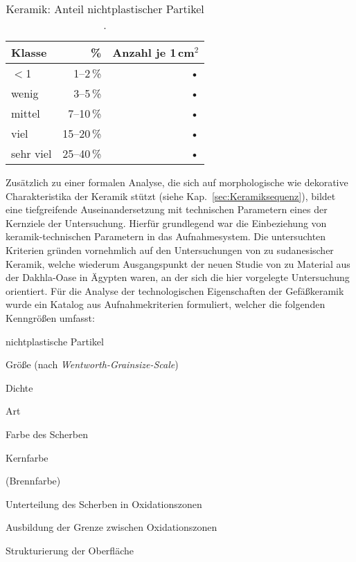\begin{table*}[!tb]
	\begin{center}
		{\small
			\begin{tabular}{@{}lrr@{}}
				\toprule
				\textbf{Klasse} & \textbf{\%} & \textbf{Anzahl je 1\,cm$^2$} \\
				\midrule
				$<$1 & 1--2\,\% & • \\
				wenig & 3--5\,\% & • \\
				mittel & 7--10\,\% & • \\
				viel & 15--20\,\% & • \\
				sehr viel & 25--40\,\% & • \\
				\bottomrule
		\end{tabular} }
	\end{center}
	\caption{Keramik: Anteil nichtplastischer Partikel \parencite[Prozentwerte nach][]{Hodgson.1976}.}
	\label{tab:Keramik_PartikelDichte}
\end{table*}

Zusätzlich zu einer formalen Analyse, die sich auf morphologische wie dekorative Charakteristika der Keramik stützt (siehe Kap.~\ref{sec:Keramiksequenz}), bildet eine tiefgreifende Auseinandersetzung mit technischen Parametern eines der Kernziele der Untersuchung. Hierfür grundlegend war die Einbeziehung von keramik-technischen Parametern in das Aufnahmesystem. Die untersuchten Kriterien gründen vornehmlich auf den Untersuchungen von \textcite{Nordstrom.1972} zu sudanesischer Keramik, welche wiederum Ausgangspunkt der neuen Studie von \textcite{Riemer.2011} zu Material aus der Dakhla-Oase in Ägypten waren, an der sich die hier vorgelegte Untersuchung orientiert. Für die Analyse der technologischen Eigenschaften der Gefäßkeramik wurde ein Katalog aus Aufnahmekriterien formuliert, welcher die folgenden Kenngrößen umfasst:
\begin{itemize*}
	\renewcommand\labelitemi{--}
	\item nichtplastische Partikel
	\begin{itemize*}
		\item Größe (nach \textit{Wentworth-Grainsize-Scale})
		\item Dichte \parencites[Tab.~\ref{tab:Keramik_PartikelDichte}; siehe][32]{Kinne.2009}[nach][]{Hodgson.1976}
		\item Art
	\end{itemize*}
	\item Farbe des Scherben
	\begin{itemize*}
		\renewcommand\labelitemi{--}
		\item Kernfarbe
		\item (Brennfarbe)
		\item Unterteilung des Scherben in Oxidationszonen
		\item Ausbildung der Grenze zwischen Oxidationszonen
	\end{itemize*}
	\item Strukturierung der Oberfläche
\end{itemize*}


